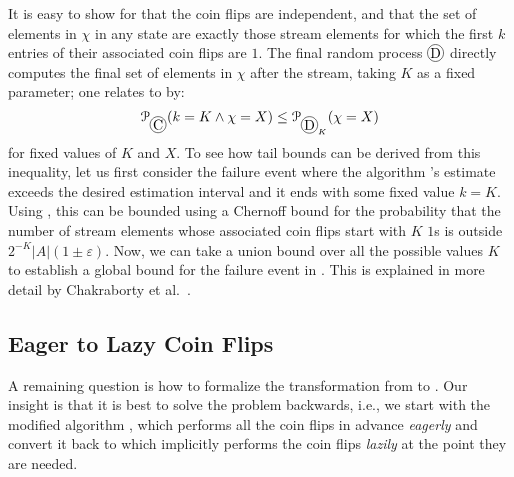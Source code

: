 It is easy to show for  that the coin flips are independent, and that the set of elements in $\chi$ in any state are exactly those stream elements for which the first $k$ entries of their associated coin flips are $1$.
The final random process $\circled{D}$ directly computes the final set of elements in $\chi$ after the stream, taking $K$ as a fixed parameter; one relates  to  by:
\[ \prob_{\circled{C}}(k = K \land \chi = X)  \leq \prob_{\circled{D}_K}(\chi = X)\]
for fixed values of $K$ and $X$.
To see how tail bounds can be derived from this inequality, let us first consider the failure event where the algorithm 's estimate exceeds the desired estimation interval and it ends with some fixed value $k = K$.
Using , this can be bounded using a Chernoff bound for the probability that the number of stream elements whose associated coin flips start with $K$ $1$s is outside $2^{-K} |A| (1 \pm \varepsilon)$.
Now, we can take a union bound over all the possible values $K$ to establish a global bound for the failure event in .
This is explained in more detail by Chakraborty et al.~\cite{chakraborty2023}.

%
\subsection{Eager to Lazy Coin Flips}
A remaining question is how to formalize the transformation from  to .
Our insight is that it is best to solve the problem backwards, i.e., we start with the modified algorithm , which performs all the coin flips in advance \emph{eagerly} and convert it back to  which implicitly performs the coin flips \emph{lazily} at the point they are needed.

